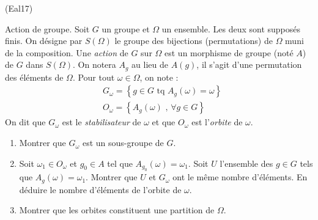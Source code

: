 \begin{tiny}(Eal17)\end{tiny} Action de groupe.\newline
Soit $G$ un groupe et $\Omega$ un ensemble. Les deux sont supposés finis. On désigne par $S(\Omega)$ le groupe des bijections (permutations) de $\Omega$ muni de la composition.\newline
Une \emph{action} de $G$ sur $\Omega$ est un morphisme de groupe (noté $A$) de $G$ dans $S(\Omega)$. On notera $A_g$ au lieu de $A(g)$, il s'agit d'une permutation des éléments de $\Omega$.\newline
Pour tout $\omega\in \Omega$, on note :
\begin{align*}
 &G_\omega = \left\lbrace g\in G\text{ tq } A_g(\omega)=\omega \right\rbrace\\
 &O_\omega = \left\lbrace A_g(\omega) \text{ , } \forall g\in G \right\rbrace
\end{align*}
On dit que $G_\omega$ est le \emph{stabilisateur} de $\omega$ et que $O_\omega$ est l'\emph{orbite} de $\omega$.
\begin{enumerate}
 \item Montrer que $G_\omega$ est un sous-groupe de $G$.
 \item Soit $\omega_1\in O_\omega$ et $g_0\in A$ tel que $A_{g_0}(\omega)=\omega_1$. Soit $U$ l'ensemble des $g\in G$ tels que $A_g(\omega)=\omega_1$. Montrer que  $U$ et $G_\omega$ ont le même nombre d'éléments. En déduire le nombre d'éléments de l'orbite de $\omega$.
\item Montrer que les orbites constituent une partition de $\Omega$.
\end{enumerate}
